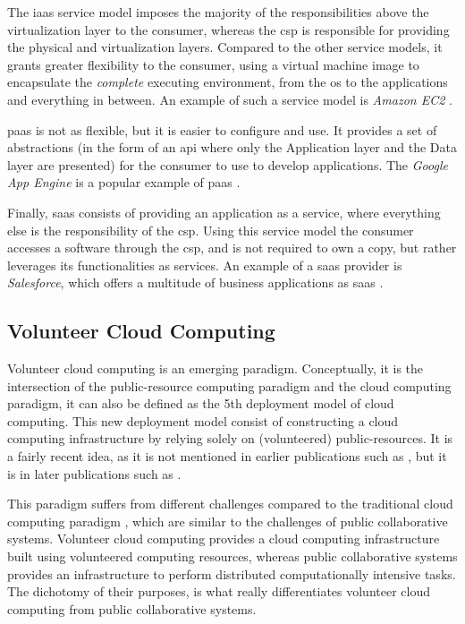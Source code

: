 \documentclass[12pt, titlepage]{uo_temp}
\begin{document}
     The \gls{iaas} service model imposes the majority of the responsibilities above the
     virtualization layer to the consumer, whereas the \gls{csp} is responsible for
     providing the physical and virtualization layers. Compared to the other service
     models, it grants greater flexibility to the consumer, using a virtual machine image
     to encapsulate the \emph{complete} executing environment, from the \gls{os} to the
     applications and everything in between. An example of such a service model is
     \emph{Amazon EC2} \cite{AWS}.

     \gls{paas} is not as flexible, but it is easier to configure and use. It provides a
     set of abstractions (in the form of an \gls{api} where only the Application layer and
     the Data layer are presented) for the consumer to use to develop applications. The
     \emph{Google App Engine} is a popular example of \gls{paas} \cite{gae_web}.

     Finally, \gls{saas} consists of providing an application as a service, where
     everything else is the responsibility of the \gls{csp}. Using this service model the consumer
     accesses a software through the \gls{csp}, and is not required to own a copy, but
     rather leverages its functionalities as services. An example of a \gls{saas} provider
     is \emph{Salesforce}, which offers a multitude of business applications as \gls{saas}
     \cite{salesforce}.

     \subsection{Volunteer Cloud Computing} \label{VCC}
     Volunteer cloud computing is an emerging paradigm. Conceptually, it is the
     intersection of the public-resource computing paradigm and the cloud computing
     paradigm, it can also be defined as the 5th deployment model of cloud computing. This
     new deployment model consist of constructing a cloud computing infrastructure by
     relying solely on (volunteered) public-resources. It is a fairly recent idea, as it
     is not mentioned in earlier publications such as \cite{taxonomy}, but it is in later
     publications such as \cite{soa_cloud}.

     This paradigm suffers from different challenges compared to the traditional cloud
     computing paradigm \cite{anjomshoa2015taxonomy}, which are similar to the challenges of
     public collaborative systems. Volunteer cloud computing provides a cloud computing
     infrastructure built using volunteered computing resources, whereas public
     collaborative systems provides an infrastructure to perform distributed
     computationally intensive tasks. The dichotomy of their purposes, is what really
     differentiates volunteer cloud computing from public collaborative systems.
\end{document}
